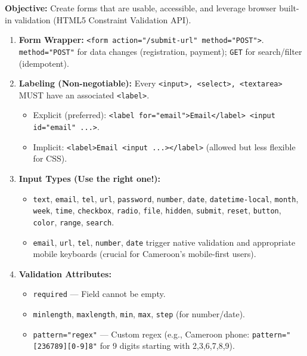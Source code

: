 \documentclass[11pt]{article}
\begin{document}
\begin{methode}
\textbf{Objective:} Create forms that are usable, accessible, and leverage browser built-in validation (HTML5 Constraint Validation API).
\begin{enumerate}
    \item \textbf{Form Wrapper:} \texttt{<form action="/submit-url" method="POST">}. \texttt{method="POST"} for data changes (registration, payment); \texttt{GET} for search/filter (idempotent).
    \item \textbf{Labeling (Non-negotiable):} Every \texttt{<input>, <select>, <textarea>} MUST have an associated \texttt{<label>}.
        \begin{itemize}
            \item Explicit (preferred): \texttt{<label for="email">Email</label> <input id="email" ...>}.
            \item Implicit: \texttt{<label>Email <input ...></label>} (allowed but less flexible for CSS).
        \end{itemize}
    \item \textbf{Input Types (Use the right one!):}
        \begin{itemize}
            \item \texttt{text}, \texttt{email}, \texttt{tel}, \texttt{url}, \texttt{password}, \texttt{number}, \texttt{date}, \texttt{datetime-local}, \texttt{month}, \texttt{week}, \texttt{time}, \texttt{checkbox}, \texttt{radio}, \texttt{file}, \texttt{hidden}, \texttt{submit}, \texttt{reset}, \texttt{button}, \texttt{color}, \texttt{range}, \texttt{search}.
            \item \texttt{email}, \texttt{url}, \texttt{tel}, \texttt{number}, \texttt{date} trigger native validation and appropriate mobile keyboards (crucial for Cameroon's mobile-first users).
        \end{itemize}
    \item \textbf{Validation Attributes:}
        \begin{itemize}
            \item \texttt{required} — Field cannot be empty.
            \item \texttt{minlength}, \texttt{maxlength}, \texttt{min}, \texttt{max}, \texttt{step} (for number/date).
            \item \texttt{pattern="regex"} — Custom regex (e.g., Cameroon phone: \texttt{pattern="[236789][0-9]{8}"} for 9 digits starting with 2,3,6,7,8,9).

\end{itemize}
\end{enumerate}
\end{methode}
\end{document}
